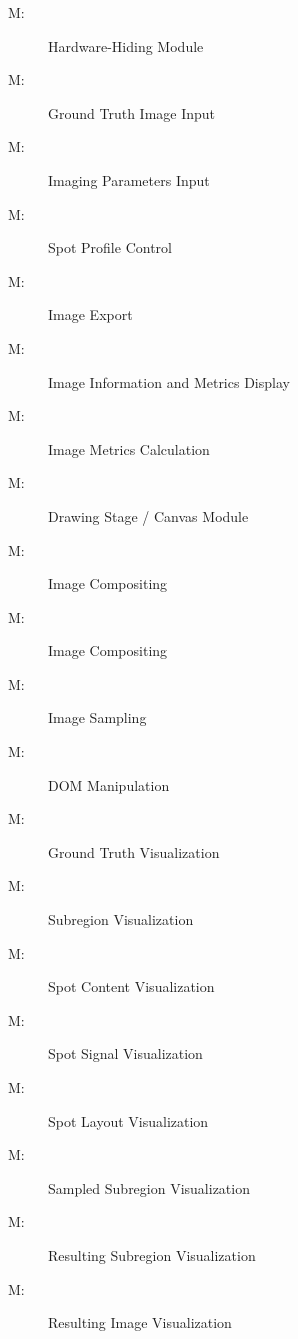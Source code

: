 \documentclass[12pt, titlepage]{article}
\newcounter{mnum}
\newcommand{\mthemnum}{M\themnum}
\begin{document}
\begin{description}
\item [ \mthemnum \label{M_HdwHide}:] Hardware-Hiding Module
\item [ \mthemnum \label{M_GT}:] Ground Truth Image Input
\item [ \mthemnum \label{M_params}:] Imaging Parameters Input
\item [ \mthemnum \label{M_vizSpotProfile}:] Spot Profile Control
\item [ \mthemnum \label{M_export}:] Image Export
\item [ \mthemnum \label{M_imgInfo}:] Image Information and Metrics Display
\item [ \mthemnum \label{M_metric}:] Image Metrics Calculation
\item [ \mthemnum \label{M_stage}:] Drawing Stage / Canvas Module
\item [ \mthemnum \label{M_compositing}:] Image Compositing
\item [ \mthemnum \label{M_rendering}:] Image Compositing
\item [ \mthemnum \label{M_sampling}:] Image Sampling
\item [ \mthemnum \label{M_DOM}:] DOM Manipulation
\item [ \mthemnum \label{M_vizGT}:] Ground Truth Visualization
\item [ \mthemnum \label{M_vizSubregion}:] Subregion Visualization
\item [ \mthemnum \label{M_vizSpotContent}:] Spot Content Visualization
\item [ \mthemnum \label{M_vizSpotSignal}:] Spot Signal Visualization
\item [ \mthemnum \label{M_vizSpotLayout}:] Spot Layout Visualization
\item [ \mthemnum \label{M_vizSampledSub}:] Sampled Subregion Visualization
\item [ \mthemnum \label{M_vizResultSub}:] Resulting Subregion Visualization
\item [ \mthemnum \label{M_vizResultImg}:] Resulting Image Visualization
\end{description}
\end{document}
